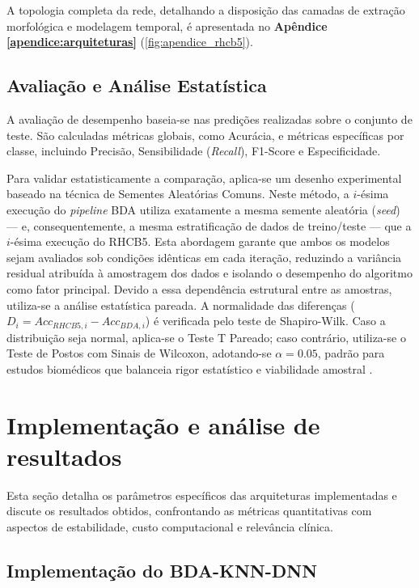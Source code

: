 \documentclass[alpha-refs,brazilian]{CC-EC_TF-TC}
\begin{document}
A topologia completa da rede, detalhando a disposição das camadas de extração morfológica e modelagem temporal, é apresentada no \textbf{Apêndice \ref{apendice:arquiteturas}} (\autoref{fig:apendice_rhcb5}).

\subsection{Avaliação e Análise Estatística}
A avaliação de desempenho baseia-se nas predições realizadas sobre o conjunto de teste. São calculadas métricas globais, como Acurácia, e métricas específicas por classe, incluindo Precisão, Sensibilidade (\textit{Recall}), F1-Score e Especificidade.

Para validar estatisticamente a comparação, aplica-se um desenho experimental baseado na técnica de Sementes Aleatórias Comuns. Neste método, a $i$-ésima execução do \textit{pipeline} BDA utiliza exatamente a mesma semente aleatória (\textit{seed}) — e, consequentemente, a mesma estratificação de dados de treino/teste — que a $i$-ésima execução do RHCB5. Esta abordagem garante que ambos os modelos sejam avaliados sob condições idênticas em cada iteração, reduzindo a variância residual atribuída à amostragem dos dados e isolando o desempenho do algoritmo como fator principal. Devido a essa dependência estrutural entre as amostras, utiliza-se a análise estatística pareada. A normalidade das diferenças ($D_i = Acc_{RHCB5,i} - Acc_{BDA,i}$) é verificada pelo teste de Shapiro-Wilk. Caso a distribuição seja normal, aplica-se o Teste T Pareado; caso contrário, utiliza-se o Teste de Postos com Sinais de Wilcoxon, adotando-se $\alpha = 0.05$, padrão para estudos biomédicos que balanceia rigor estatístico e viabilidade amostral \citep{Goodfellow2016}.

\section{Implementação e análise de resultados}

Esta seção detalha os parâmetros específicos das arquiteturas implementadas e discute os resultados obtidos, confrontando as métricas quantitativas com aspectos de estabilidade, custo computacional e relevância clínica.

\subsection{Implementação do BDA-KNN-DNN}
\end{document}
